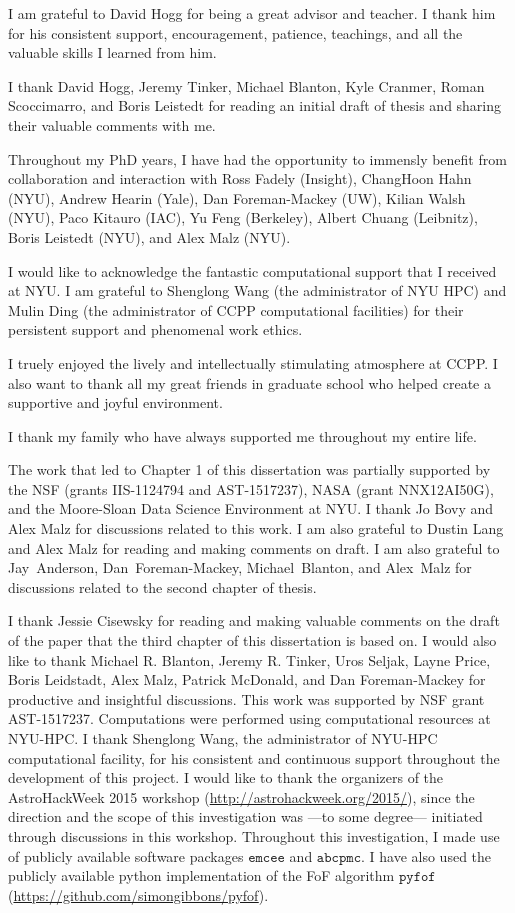 I am grateful to David Hogg for being a great advisor and teacher. 
I thank him for his consistent support, encouragement, patience, teachings, 
and all the valuable skills I learned from him.

I thank David Hogg, Jeremy Tinker, Michael Blanton, Kyle Cranmer, Roman Scoccimarro, and Boris Leistedt for 
reading an initial draft of thesis and sharing their valuable comments with me.

Throughout my PhD years, I have had the opportunity to immensly benefit from collaboration and 
interaction with Ross Fadely (Insight), ChangHoon Hahn (NYU), Andrew Hearin (Yale), Dan Foreman-Mackey (UW), 
Kilian Walsh (NYU), Paco Kitauro (IAC), Yu Feng (Berkeley), Albert Chuang (Leibnitz), Boris Leistedt (NYU), 
and Alex Malz (NYU).

I would like to acknowledge the fantastic computational support that I received at NYU. 
I am grateful to Shenglong Wang (the administrator of NYU HPC) and Mulin Ding (the administrator 
of CCPP computational facilities) for their persistent support and phenomenal work ethics. 

I truely enjoyed the lively and intellectually stimulating atmosphere at CCPP.
I also want to thank all my great friends in graduate school who helped create a 
supportive and joyful environment.  

I thank my family who have always supported me throughout my entire life.

The work that led to Chapter 1 of this dissertation was partially supported by the NSF (grants IIS-1124794 and AST-1517237), 
NASA (grant NNX12AI50G), and the Moore-Sloan Data Science Environment at NYU. 
I thank Jo Bovy and Alex Malz for discussions related to this work. 
I am also grateful to Dustin Lang and Alex Malz for reading and making comments on draft. 
I am also grateful to Jay~Anderson, Dan~Foreman-Mackey, Michael~Blanton, and Alex~Malz for discussions related to the second chapter 
of thesis.

I thank Jessie Cisewsky for reading and making valuable comments on the draft of the paper that the third chapter of this dissertation 
is based on. I would also like to thank Michael R. Blanton, Jeremy R. Tinker, Uros Seljak, Layne Price, 
Boris Leidstadt, Alex Malz, Patrick McDonald, and Dan Foreman-Mackey for productive 
and insightful discussions. This work was supported by NSF grant AST-1517237. Computations 
were performed using computational resources at NYU-HPC. I thank Shenglong Wang, the 
administrator of NYU-HPC computational facility, for his consistent and continuous support 
throughout the development of this project. I would like to thank the organizers of 
the AstroHackWeek 2015 workshop (\url{http://astrohackweek.org/2015/}), 
since the direction and the scope of this investigation was ---to some degree--- initiated 
through discussions in this workshop. Throughout this investigation, I made use of 
publicly available software packages $\mathtt{emcee}$ and $\mathtt{abcpmc}$. 
I have also used the publicly available python implementation of the FoF algorithm 
$\mathtt{pyfof}$ (\url{https://github.com/simongibbons/pyfof}).

